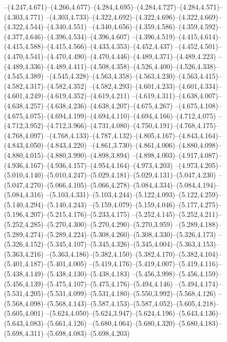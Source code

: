   --(4.247,4.671)--(4.266,4.677)--(4.284,4.695)--(4.284,4.727)--(4.284,4.571)--(4.303,4.771)%
  --(4.303,4.733)--(4.322,4.692)--(4.322,4.696)--(4.322,4.669)--(4.322,4.544)--(4.340,4.551)%
  --(4.340,4.656)--(4.359,4.586)--(4.359,4.592)--(4.377,4.646)--(4.396,4.534)--(4.396,4.607)%
  --(4.396,4.519)--(4.415,4.614)--(4.415,4.588)--(4.415,4.566)--(4.433,4.353)--(4.452,4.437)%
  --(4.452,4.501)--(4.470,4.541)--(4.470,4.490)--(4.470,4.446)--(4.489,4.371)--(4.489,4.223)%
  --(4.489,4.336)--(4.489,4.411)--(4.508,4.358)--(4.526,4.400)--(4.526,4.338)--(4.545,4.389)%
  --(4.545,4.328)--(4.563,4.358)--(4.563,4.230)--(4.563,4.415)--(4.582,4.317)--(4.582,4.352)%
  --(4.582,4.293)--(4.601,4.233)--(4.601,4.334)--(4.601,4.249)--(4.619,4.352)--(4.619,4.211)%
  --(4.619,4.311)--(4.638,4.007)--(4.638,4.257)--(4.638,4.236)--(4.638,4.207)--(4.675,4.267)%
  --(4.675,4.108)--(4.675,4.075)--(4.694,4.199)--(4.694,4.110)--(4.694,4.166)--(4.712,4.075)%
  --(4.712,3.952)--(4.712,3.966)--(4.731,4.080)--(4.750,4.191)--(4.768,4.175)--(4.768,4.097)%
  --(4.768,4.133)--(4.787,4.132)--(4.805,4.167)--(4.843,4.164)--(4.843,4.050)--(4.843,4.220)%
  --(4.861,3.730)--(4.861,4.006)--(4.880,4.098)--(4.880,4.015)--(4.880,3.990)--(4.898,3.894)%
  --(4.898,4.003)--(4.917,4.087)--(4.936,4.167)--(4.936,4.157)--(4.954,4.164)--(4.973,4.203)%
  --(4.973,4.205)--(5.010,4.140)--(5.010,4.247)--(5.029,4.181)--(5.029,4.131)--(5.047,4.230)%
  --(5.047,4.270)--(5.066,4.105)--(5.066,4.278)--(5.084,4.334)--(5.084,4.194)--(5.084,4.316)%
  --(5.103,4.331)--(5.103,4.244)--(5.122,4.093)--(5.122,4.259)--(5.140,4.294)--(5.140,4.243)%
  --(5.159,4.079)--(5.159,4.046)--(5.177,4.275)--(5.196,4.207)--(5.215,4.176)--(5.233,4.175)%
  --(5.252,4.145)--(5.252,4.211)--(5.252,4.285)--(5.270,4.300)--(5.270,4.290)--(5.270,3.959)%
  --(5.289,4.188)--(5.289,4.274)--(5.289,4.224)--(5.308,4.260)--(5.308,4.330)--(5.326,4.173)%
  --(5.326,4.152)--(5.345,4.107)--(5.345,4.326)--(5.345,4.004)--(5.363,4.153)--(5.363,4.216)%
  --(5.363,4.186)--(5.382,4.150)--(5.382,4.170)--(5.382,4.104)--(5.401,4.187)--(5.401,4.005)%
  --(5.419,4.176)--(5.419,4.007)--(5.419,4.116)--(5.438,4.149)--(5.438,4.130)--(5.438,4.183)%
  --(5.456,3.998)--(5.456,4.159)--(5.456,4.139)--(5.475,4.107)--(5.475,4.176)--(5.494,4.146)%
  --(5.494,4.174)--(5.531,4.205)--(5.531,4.099)--(5.531,4.180)--(5.550,3.992)--(5.568,4.126)%
  --(5.568,4.098)--(5.568,4.143)--(5.587,4.153)--(5.587,4.052)--(5.605,4.218)--(5.605,4.001)%
  --(5.624,4.050)--(5.624,3.947)--(5.624,4.196)--(5.643,4.136)--(5.643,4.083)--(5.661,4.126)%
  --(5.680,4.064)--(5.680,4.320)--(5.680,4.183)--(5.698,4.311)--(5.698,4.083)--(5.698,4.203)%
